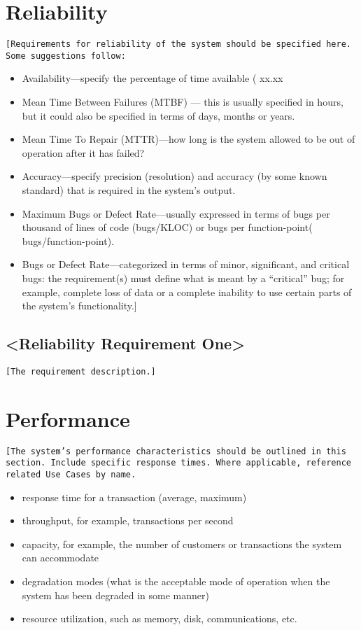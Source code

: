 \documentclass[a4paper,12pt,chapterprefix=false,bibliography=totoc,listof=totoc]{scrreprt}
\begin{document}
\section{Reliability}
\begin{verbatim}
[Requirements for reliability of the system should be specified here. Some suggestions follow:
\end{verbatim}
\begin{itemize}
	\item Availability—specify the percentage of time available ( xx.xx%
	\item Mean Time Between Failures (MTBF) — this is usually specified in hours, but it could also be specified in terms of days, months or years.
	\item Mean Time To Repair (MTTR)—how long is the system allowed to be out of operation after it has failed?
	\item Accuracy—specify precision (resolution) and accuracy (by some known standard) that is required in the system’s output.
	\item Maximum Bugs or Defect Rate—usually expressed in terms of bugs per thousand of lines of code (bugs/KLOC) or bugs per function-point( bugs/function-point).
	\item Bugs or Defect Rate—categorized in terms of minor, significant, and critical bugs: the requirement(s) must define what is meant by a “critical” bug; for example, complete loss of data or a complete inability to use certain parts of the system’s functionality.]
\end{itemize}

\subsection{<Reliability Requirement One>}
\begin{verbatim}
[The requirement description.]
\end{verbatim}

\section{Performance}
\begin{verbatim}
[The system’s performance characteristics should be outlined in this section. Include specific response times. Where applicable, reference related Use Cases by name.
\end{verbatim}
\begin{itemize}
	\item response time for a transaction (average, maximum)
	\item throughput, for example, transactions per second
	\item capacity, for example, the number of customers or transactions the system can accommodate
	\item degradation modes (what is the acceptable mode of operation when the system has been degraded in some manner)
	\item resource utilization, such as memory, disk, communications, etc.
\end{itemize}
\end{document}
